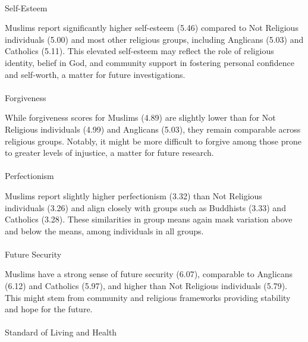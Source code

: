 \documentclass[
  single column]{article}
\makeatletter
\let\oldparagraph\paragraph
\renewcommand{\paragraph}{
    \@ifstar
      \xxxParagraphStar
      \xxxParagraphNoStar
  }
\newcommand{\xxxParagraphStar}[1]{\oldparagraph*{#1}\mbox{}}
\newcommand{\xxxParagraphNoStar}[1]{\oldparagraph{#1}\mbox{}}
\makeatother
\begin{document}
\paragraph{Self-Esteem}\label{self-esteem}

Muslims report significantly higher self-esteem (5.46) compared to Not
Religious individuals (5.00) and most other religious groups, including
Anglicans (5.03) and Catholics (5.11). This elevated self-esteem may
reflect the role of religious identity, belief in God, and community
support in fostering personal confidence and self-worth, a matter for
future investigations.

\paragraph{Forgiveness}\label{forgiveness}

While forgiveness scores for Muslims (4.89) are slightly lower than for
Not Religious individuals (4.99) and Anglicans (5.03), they remain
comparable across religious groups. Notably, it might be more difficult
to forgive among those prone to greater levels of injustice, a matter
for future research.

\paragraph{Perfectionism}\label{perfectionism}

Muslims report slightly higher perfectionism (3.32) than Not Religious
individuals (3.26) and align closely with groups such as Buddhists
(3.33) and Catholics (3.28). These similarities in group means again
mask variation above and below the means, among individuals in all
groups.

\paragraph{Future Security}\label{future-security}

Muslims have a strong sense of future security (6.07), comparable to
Anglicans (6.12) and Catholics (5.97), and higher than Not Religious
individuals (5.79). This might stem from community and religious
frameworks providing stability and hope for the future.

\paragraph{Standard of Living and
Health}\label{standard-of-living-and-health}
\end{document}
